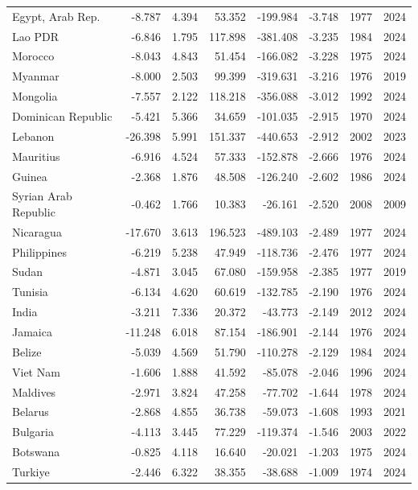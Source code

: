 \begin{table}[p]
{\begin{tabular}{lrrrrrrr}
  Egypt, Arab Rep. & -8.787 & 4.394 & 53.352 & -199.984 & -3.748 & 1977 & 2024 \\ 
  Lao PDR & -6.846 & 1.795 & 117.898 & -381.408 & -3.235 & 1984 & 2024 \\ 
  Morocco & -8.043 & 4.843 & 51.454 & -166.082 & -3.228 & 1975 & 2024 \\ 
  Myanmar & -8.000 & 2.503 & 99.399 & -319.631 & -3.216 & 1976 & 2019 \\ 
  Mongolia & -7.557 & 2.122 & 118.218 & -356.088 & -3.012 & 1992 & 2024 \\ 
  Dominican Republic & -5.421 & 5.366 & 34.659 & -101.035 & -2.915 & 1970 & 2024 \\ 
  Lebanon & -26.398 & 5.991 & 151.337 & -440.653 & -2.912 & 2002 & 2023 \\ 
  Mauritius & -6.916 & 4.524 & 57.333 & -152.878 & -2.666 & 1976 & 2024 \\ 
  Guinea & -2.368 & 1.876 & 48.508 & -126.240 & -2.602 & 1986 & 2024 \\ 
  Syrian Arab Republic & -0.462 & 1.766 & 10.383 & -26.161 & -2.520 & 2008 & 2009 \\ 
  Nicaragua & -17.670 & 3.613 & 196.523 & -489.103 & -2.489 & 1977 & 2024 \\ 
  Philippines & -6.219 & 5.238 & 47.949 & -118.736 & -2.476 & 1977 & 2024 \\ 
  Sudan & -4.871 & 3.045 & 67.080 & -159.958 & -2.385 & 1977 & 2019 \\ 
  Tunisia & -6.134 & 4.620 & 60.619 & -132.785 & -2.190 & 1976 & 2024 \\ 
  India & -3.211 & 7.336 & 20.372 & -43.773 & -2.149 & 2012 & 2024 \\ 
  Jamaica & -11.248 & 6.018 & 87.154 & -186.901 & -2.144 & 1976 & 2024 \\ 
  Belize & -5.039 & 4.569 & 51.790 & -110.278 & -2.129 & 1984 & 2024 \\ 
  Viet Nam & -1.606 & 1.888 & 41.592 & -85.078 & -2.046 & 1996 & 2024 \\ 
  Maldives & -2.971 & 3.824 & 47.258 & -77.702 & -1.644 & 1978 & 2024 \\ 
  Belarus & -2.868 & 4.855 & 36.738 & -59.073 & -1.608 & 1993 & 2021 \\ 
  Bulgaria & -4.113 & 3.445 & 77.229 & -119.374 & -1.546 & 2003 & 2022 \\ 
  Botswana & -0.825 & 4.118 & 16.640 & -20.021 & -1.203 & 1975 & 2024 \\ 
  Turkiye & -2.446 & 6.322 & 38.355 & -38.688 & -1.009 & 1974 & 2024 \\ 

\end{tabular}}
\end{table}
